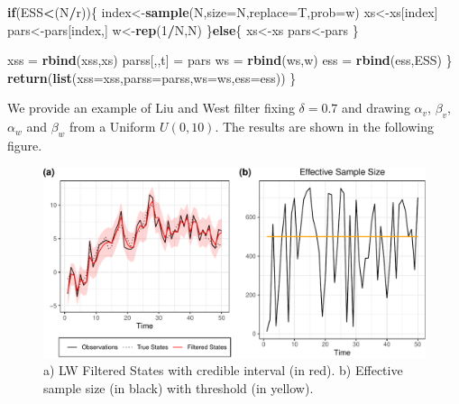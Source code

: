 \documentclass[
]{book}
\newenvironment{Shaded}{\begin{snugshade}}{\end{snugshade}}
\newcommand{\ControlFlowTok}[1]{\textcolor[rgb]{0.13,0.29,0.53}{\textbf{#1}}}
\newcommand{\DataTypeTok}[1]{\textcolor[rgb]{0.13,0.29,0.53}{#1}}
\newcommand{\DecValTok}[1]{\textcolor[rgb]{0.00,0.00,0.81}{#1}}
\newcommand{\KeywordTok}[1]{\textcolor[rgb]{0.13,0.29,0.53}{\textbf{#1}}}
\newcommand{\NormalTok}[1]{#1}
\newcommand{\OperatorTok}[1]{\textcolor[rgb]{0.81,0.36,0.00}{\textbf{#1}}}
\newcommand{\StringTok}[1]{\textcolor[rgb]{0.31,0.60,0.02}{#1}}
\theoremstyle{break}
\theoremstyle{nonumberplain}
\begin{document}
\begin{Shaded}
\begin{Highlighting}[]
    \ControlFlowTok{if}\NormalTok{(ESS}\OperatorTok{<}\NormalTok{(N}\OperatorTok{/}\NormalTok{r))\{}
\NormalTok{      index<-}\KeywordTok{sample}\NormalTok{(N,}\DataTypeTok{size=}\NormalTok{N,}\DataTypeTok{replace=}\NormalTok{T,}\DataTypeTok{prob=}\NormalTok{w)}
\NormalTok{      xs<-xs[index]}
\NormalTok{      pars<-pars[index,]}
\NormalTok{      w<-}\KeywordTok{rep}\NormalTok{(}\DecValTok{1}\OperatorTok{/}\NormalTok{N,N)}
\NormalTok{    \}}\ControlFlowTok{else}\NormalTok{\{}
\NormalTok{      xs<-xs}
\NormalTok{      pars<-pars}
\NormalTok{    \}}
    
    
\NormalTok{    xss         =}\StringTok{ }\KeywordTok{rbind}\NormalTok{(xss,xs)}
\NormalTok{    parss[,,t]  =}\StringTok{ }\NormalTok{pars }
\NormalTok{    ws          =}\StringTok{ }\KeywordTok{rbind}\NormalTok{(ws,w)}
\NormalTok{    ess         =}\StringTok{ }\KeywordTok{rbind}\NormalTok{(ess,ESS)}
\NormalTok{  \}}
  \KeywordTok{return}\NormalTok{(}\KeywordTok{list}\NormalTok{(}\DataTypeTok{xss=}\NormalTok{xss,}\DataTypeTok{parss=}\NormalTok{parss,}\DataTypeTok{ws=}\NormalTok{ws,}\DataTypeTok{ess=}\NormalTok{ess))}
\NormalTok{\}}
\end{Highlighting}
\end{Shaded}

We provide an example of Liu and West filter fixing \(\delta=0.7\) and
drawing \(\alpha_{v}\), \(\beta_{v}\), \(\alpha_{w}\) and \(\beta_{w}\)
from a Uniform \(U(0,10)\). The results are shown in the following
figure.

\begin{figure}[H]

{\centering \includegraphics{prova_knit_finale_files/figure-latex/unnamed-chunk-28-1} 

}

\caption{a) LW Filtered States with credible interval (in red). b) Effective sample size (in black) with threshold (in yellow).}\label{fig:unnamed-chunk-28}
\end{figure}
\end{document}
